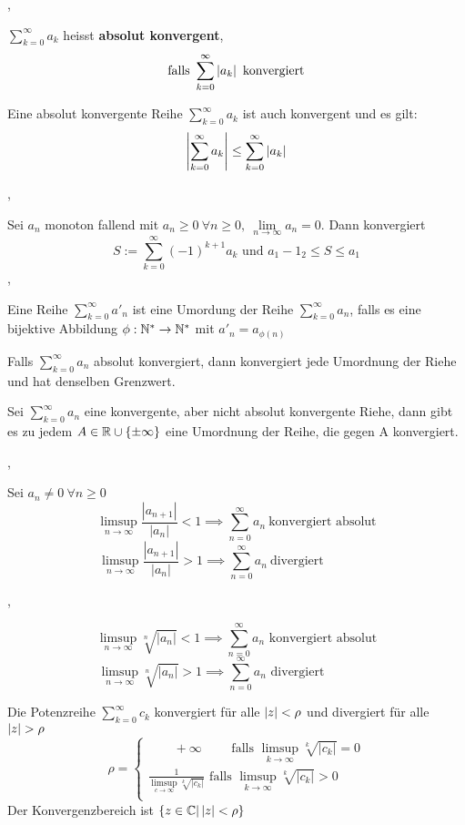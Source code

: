 \sep

\Satz[2.7.9] $\sum_{k=0}^{\infty} a_{k}$ heisst \textbf{absolut konvergent}, 
\[ \text{falls } \sum_{k=0}^{\infty} \left\lvert a_{k} \right\rvert \text{ konvergiert} \]

\Satz[2.7.10] Eine absolut konvergente Reihe $\sum_{k=0}^{\infty} a_{k}$ ist auch konvergent und es gilt:
\[ \left\lvert \sum_{k=0}^{\infty} a_{k} \right\rvert \leq \sum_{k=0}^{\infty} \left\lvert a_{k} \right\rvert\]

\sep

\Satz[2.7.12 Leibniz] Sei $a_{n}$ monoton fallend mit $a_{n} \geq 0 \ \forall n \geq 0, \ \lim\limits_{n \rightarrow \infty} a_{n} = 0.$ Dann konvergiert
\[ S :=  \sum_{k=0}^{\infty} (-1)^{k+1} a_{k} \text{ und } a_{1} - 1_{2} \leq S \leq {a_1} \]
\sep

\Def[2.7.14] Eine Reihe  $\sum_{k=0}^{\infty} a'_{n}$ ist eine Umordung der Reihe  $\sum_{k=0}^{\infty} a_{n}$, falls es eine bijektive Abbildung $\phi : \mathbb{N}^{*} \rightarrow \mathbb{N}^{*}$ mit $a'_{n} = a_{\phi(n)}$ 

\Satz[2.7.16 Dirichlet] Falls $\sum_{k=0}^{\infty} a_{n}$ absolut konvergiert, dann konvergiert jede Umordnung der Riehe und hat denselben Grenzwert.  

\Satz[Riemann] Sei $\sum_{k=0}^{\infty} a_{n}$ eine konvergente, aber nicht absolut konvergente Riehe, dann gibt es zu jedem $A \in \mathbb{R} \cup \{\pm \infty\}$ eine Umordnung der Reihe, die gegen A konvergiert. 

\sep

\Satz[Quotientenkriterium] Sei $a_{n} \neq 0 \ \forall n \geq 0$
\[\limsup\limits_{n \rightarrow \infty} \frac{\left|a_{n+1}\right|}{\left|a_{n}\right|}<1 \implies \sum_{n=0}^{\infty} a_{n} \ \text{konvergiert absolut}\]
\[\limsup\limits_{n \rightarrow \infty} \frac{\left|a_{n+1}\right|}{\left|a_{n}\right|}>1 \implies \sum_{n=0}^{\infty} a_{n} \ \text{divergiert} \quad \quad \quad \quad\]

\sep

\Satz[Wurzelkriterium] 
\[\limsup\limits_{n \rightarrow \infty} \sqrt[n]{\left|a_{n}\right|}<1 \implies \sum_{n=0}^{\infty} a_{n} \text{ konvergiert absolut} \]
\[\limsup\limits_{n \rightarrow \infty} \sqrt[n]{\left|a_{n}\right|}>1 \implies \sum_{n=0}^{\infty} a_{n} \text{ divergiert} \quad \quad \quad \quad \]

\Korollar[2.7.21] Die Potenzreihe $\sum_{k=0}^{\infty} c_{k}$ konvergiert für alle $\left\lvert z \right\rvert < \rho$ und divergiert für alle $\left\lvert z \right\rvert > \rho$
\[\rho =\begin{cases}
\quad \quad + \infty \quad \quad \text{ falls } \limsup\limits_{k \rightarrow \infty} \sqrt[k]{\left|c_{k}\right|} = 0 \\
\frac{1}{\limsup\limits_{c \rightarrow \infty} \sqrt[k]{\left|c_{k}\right|}}  \text{ falls } \limsup\limits_{k \rightarrow \infty} \sqrt[k]{\left|c_{k}\right|} > 0 \\
\end{cases}\]
\Bem Der Konvergenzbereich ist $\{z \in  \mathbb{C} | \left\lvert z \right\rvert < \rho\}$

